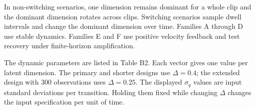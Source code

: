 \documentclass[
]{article}
\begin{document}
\begin{table}[H]

\caption{\label{tbl-scenario-families}The six Study 2 scenario families.
Dwell values are fractions of the number of observations per clip.}


\end{table}%

In non-switching scenarios, one dimension remains dominant for a whole
clip and the dominant dimension rotates across clips. Switching
scenarios sample dwell intervals and change the dominant dimension over
time. Families A through D use stable dynamics. Families E and F use
positive velocity feedback and test recovery under finite-horizon
amplification.

The dynamic parameters are listed in Table B2. Each vector gives one
value per latent dimension. The primary and shorter designs use
\(\Delta=0.4\); the extended design with 300 observations uses
\(\Delta=0.25\). The displayed \(\sigma_q\) values are input standard
deviations per transition. Holding them fixed while changing \(\Delta\)
changes the input specification per unit of time.
\end{document}
